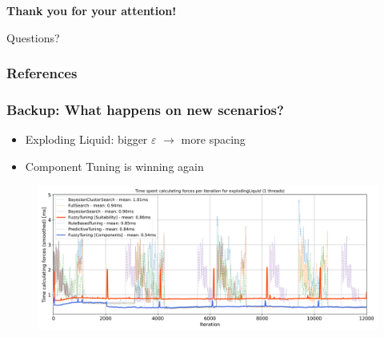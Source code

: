 \documentclass[
	10pt,
	t		%
]{beamer}
\begin{document}
\begin{frame}
	\begin{center}
		\vspace{1cm}
		{\large \textbf{Thank you for your attention!}}
		
		\vspace{2cm}
		
		\Huge{Questions?}
	\end{center}
\end{frame}

\begin{frame}
	\frametitle{References}
	\footnotesize
	
	
\end{frame}

\appendix

\begin{frame}
	\frametitle{Backup: What happens on new scenarios?}
	
	\begin{itemize}
		\item Exploding Liquid: bigger $\varepsilon$ $\rightarrow$ more spacing
		\item Component Tuning is winning again
	\end{itemize}
	
	\begin{figure}
		\centering
		\includegraphics[width=1\textwidth]{figures/exploding-liquid-timings-eps.png}
	\end{figure}
\end{frame}
\end{document}
